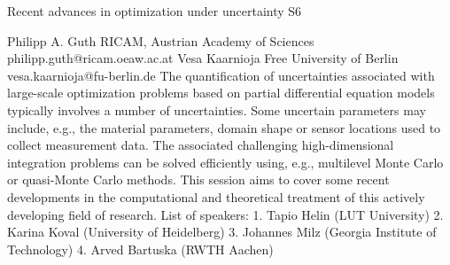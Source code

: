 \begin{session}
 {Recent advances in optimization under uncertainty}%
 {}%
 {}%
 {}%
 {}%
 {}%
 {}%
 {S6}%
 {\thirdorganizer{}{}{}}%

 {Philipp A. Guth}%
 {RICAM, Austrian Academy of Sciences}%
 {philipp.guth@ricam.oeaw.ac.at}%
 {Vesa Kaarnioja}%
 {Free University of Berlin}%
 {vesa.kaarnioja@fu-berlin.de}%
 The quantification of uncertainties associated with large-scale optimization problems based on partial differential equation models typically involves a number of uncertainties. Some uncertain parameters may include, e.g., the material parameters, domain shape or sensor locations used to collect measurement data. The associated challenging high-dimensional integration problems can be solved efficiently using, e.g., multilevel Monte Carlo or quasi-Monte Carlo methods. This session aims to cover some recent developments in the computational and theoretical treatment of this actively developing field of research.
 List of speakers:
 1. Tapio Helin (LUT University)
 2. Karina Koval (University of Heidelberg)
 3. Johannes Milz (Georgia Institute of Technology)
 4. Arved Bartuska (RWTH Aachen)
\end{session}



\clearpage

